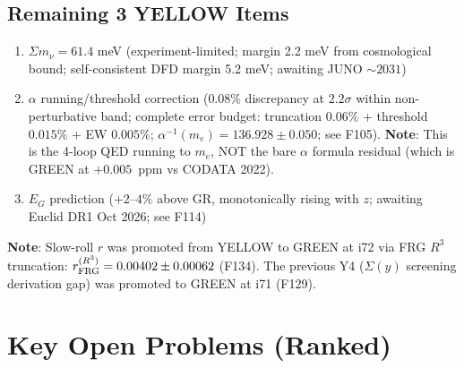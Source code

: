 \documentclass[11pt,a4paper]{article}
\begin{document}
\subsection{Remaining 3 YELLOW Items}
\begin{enumerate}
\item[\textbf{Y1}:] $\Sigma m_\nu = 61.4$ meV (experiment-limited; margin 2.2 meV from cosmological bound; self-consistent DFD margin 5.2 meV; awaiting JUNO $\sim 2031$)
\item[\textbf{Y2}:] $\alpha$ running/threshold correction ($0.08\%$ discrepancy at $2.2\sigma$ within non-perturbative band; complete error budget: truncation $0.06\%$ + threshold $0.015\%$ + EW $0.005\%$; $\alpha^{-1}(m_e) = 136.928 \pm 0.050$; see F105). \textbf{Note}: This is the 4-loop QED running to $m_e$, NOT the bare $\alpha$ formula residual (which is GREEN at $+0.005$~ppm vs CODATA 2022).
\item[\textbf{Y3}:] $E_G$ prediction ($+2$--$4\%$ above GR, monotonically rising with $z$; awaiting Euclid DR1 Oct 2026; see F114)
\end{enumerate}

\noindent
\textbf{Note}: Slow-roll $r$ was promoted from YELLOW to GREEN at i72 via FRG $R^3$ truncation: $r_{\rm FRG}^{(R^3)} = 0.00402 \pm 0.00062$ (F134). The previous Y4 ($\Sigma(y)$ screening derivation gap) was promoted to GREEN at i71 (F129).

\section{Key Open Problems (Ranked)}
\end{document}
